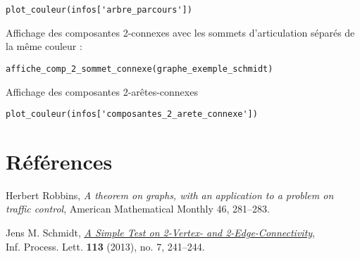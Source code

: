 \documentclass{article}      %
\begin{document}
\begin{lstlisting}[style=code-style]
plot_couleur(infos['arbre_parcours'])
\end{lstlisting}
\begin{figure}[H]
    \centering
\end{figure}

Affichage des composantes 2-connexes avec les sommets d'articulation séparés de la même couleur :
\begin{lstlisting}[style=code-style]
affiche_comp_2_sommet_connexe(graphe_exemple_schmidt)
\end{lstlisting}
\begin{figure}[H]
    \centering
\end{figure}

Affichage des composantes 2-arêtes-connexes
\begin{lstlisting}[style=code-style]
plot_couleur(infos['composantes_2_arete_connexe'])
\end{lstlisting}
\begin{figure}[H]
    \centering
\end{figure}


\section{Références}
\begin{thebibliography}{9}
Herbert Robbins, \textit{A theorem on graphs, with an application to a problem on traffic control}, American Mathematical Monthly 46, 281–283.

Jens M. Schmidt, \href{https://arxiv.org/ftp/arxiv/papers/1209/1209.0700.pdf}{\underline{\textit{A Simple Test on 2-Vertex- and 2-Edge-Connectivity}}},
\\Inf. Process. Lett. \textbf{113} (2013), no. 7, 241–244.
\end{thebibliography}
\end{document}
